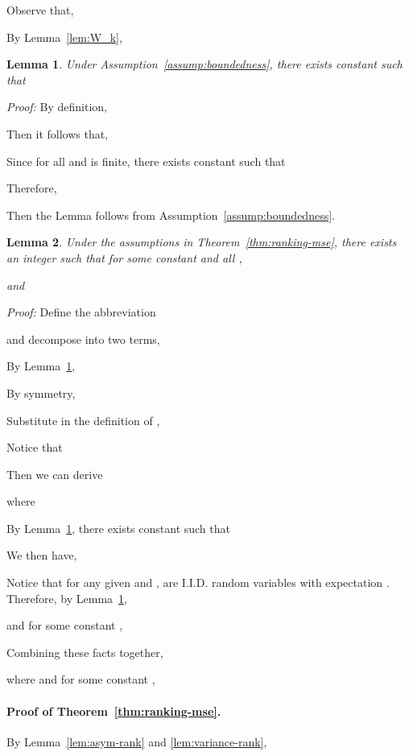 \documentclass[11pt,a4paper]{article}
\newtheorem{lemma}{Lemma}[section]
\begin{document}
Observe that, 

By Lemma~\ref{lem:W_k}, 






 \begin{lemma} Under Assumption~\ref{assump:boundedness}, there exists constant  such that

 \label{lem:boundedness}
 \end{lemma}

{\em Proof: } By definition, 

Then it follows that,


Since  for all  and  is finite, there exists constant  such that

Therefore, 

Then the Lemma follows from Assumption~\ref{assump:boundedness}.





\begin{lemma}
  Under the assumptions in Theorem~\ref{thm:ranking-mse}, there exists an integer  such that for some constant  and all , 

and 

  \label{lem:W_rk_bound}
\end{lemma}
{\em Proof: } Define the abbreviation

and decompose  into two terms, 

By Lemma~\ref{lem:boundedness}, 

By symmetry, 

Substitute in the definition of , 

Notice that 

Then we can derive
     
where 


By Lemma~\ref{lem:boundedness}, there exists constant  such that

We then have, 

Notice that for any given  and ,  are I.I.D. random variables with expectation . Therefore, by Lemma~\ref{lem:boundedness},

and for some constant , 

Combining these facts together, 

where  and for some constant , 




\paragraph{Proof of Theorem~\ref{thm:ranking-mse}.}
By Lemma~\ref{lem:asym-rank} and \ref{lem:variance-rank}, 
\end{document}
